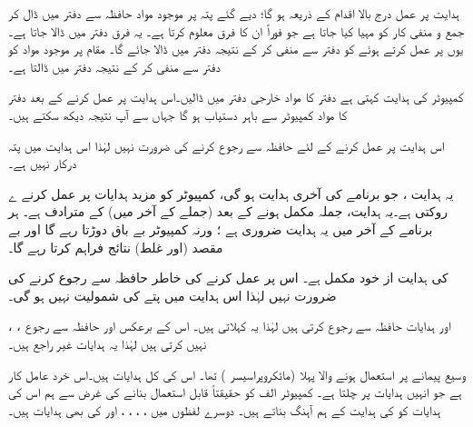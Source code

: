  ہدایت  پر عمل درج بالا اقدام کے ذریعہ ہو گا؛ دیے گئے پتہ پر موجود مواد حافظہ سے دفتر   میں ڈال کر جمع و منفی کار کو مہیا کیا جاتا ہے جو فوراً ان کا فرق معلوم کرتا ہے۔ یہ فرق دفتر  میں ڈالا جاتا ہے۔ یوں  پر عمل کرتے ہوئے  کو دفتر  سے منفی کر کے نتیجہ دفتر  میں ڈالا جائے گا۔  مقام   پر موجود مواد  کو دفتر  سے منفی کر کے نتیجہ دفتر  میں ڈالتا ہے۔

کمپیوٹر کی ہدایت    کہتی ہے دفتر  کا مواد خارجی دفتر میں ڈالیں۔اس ہدایت پر عمل کرنے کے بعد دفتر  کا مواد کمپیوٹر سے باہر دستیاب ہو گا جہاں سے آپ نتیجہ دیکھ سکتے ہیں۔

اس ہدایت پر عمل کرنے کے لئے  حافظہ سے رجوع کرنے کی ضرورت نہیں لہٰذا اس ہدایت میں پتہ درکار نہیں ہے۔

یہ ہدایت  ، جو برنامے کی آخری ہدایت ہو گی، کمپیوٹر کو  مزید ہدایات پر عمل کرنے ے روکتی ہے۔یہ ہدایت،  جملہ مکمل ہونے کے بعد    (جملے کے آخر میں)  کے مترادف ہے۔ ہر برنامے کے آخر میں یہ ہدایت ضروری ہے ؛  ورنہ کمپیوٹر  بے باق   دوڑتا رہے گا  اور بے مقصد (اور غلط) نتائج فراہم کرتا رہے گا۔

 کی ہدایت از خود مکمل ہے۔ اس پر عمل کرنے کی خاطر حافظہ سے رجوع کرنے کی ضرورت نہیں لہٰذا اس ہدایت میں پتے کی شمولیت نہیں ہو گی۔

،  ، اور   ہدایات حافظہ سے رجوع کرتی  ہیں لہٰذا یہ کہلاتی ہیں۔ اس کے برعکس   اور     حافظہ سے رجوع نہیں کرتی ہیں لہٰذا یہ ہدایات غیر راجع  ہیں۔

وسیع  پیمانے پر استعمال ہونے والا  پہلا  (مائکروپراسیسر )   تھا۔ اس کی کل  ہدایات ہیں۔اس خرد عامل کار  ہے  جو انہیں ہدایات پر چلتا ہے۔   کمپیوٹر  الف کو حقیقتاً قابل استعمال بنانے کی غرض سے ہم  اس کی ہدایات کو    کی ہدایت کے  ہم آہنگ بناتے ہیں۔ دوسرے لفظوں میں  ، ، ، ، اور     کی بھی ہدایات ہیں۔

